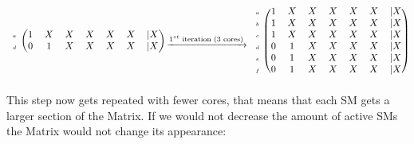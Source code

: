 \documentclass[draft, final]{vutinfth} %
\begin{document}
				\begin{equation}
					\begin{aligned}
						\begin{blockarray}{cccccccc}
							\begin{block}{c(ccccccc)}
								\scriptscriptstyle{a} & 1 & X & X & X & X & X &| X \\ 
								\scriptscriptstyle{d} & 0 & 1 & X & X & X & X &| X \\ 
							\end{block}
						\end{blockarray}
						\xrightarrow[]{\text{$1^{st}$ iteration (3 cores)}}
						\begin{blockarray}{cccccccc}
							\begin{block}{c(ccccccc)}
								\scriptscriptstyle{a} & 1 & X & X & X & X & X &| X \\ 
								\scriptscriptstyle{b} & 1 & X & X & X & X & X &| X \\ 
								\scriptscriptstyle{c} & 1 & X & X & X & X & X &| X \\ 
								\scriptscriptstyle{d} & 0 & 1 & X & X & X & X &| X \\ 
								\scriptscriptstyle{e} & 0 & 1 & X & X & X & X &| X \\ 
								\scriptscriptstyle{f} & 0 & 1 & X & X & X & X &| X \\
							\end{block}
						\end{blockarray}
					\end{aligned}
				\end{equation}
				This step now gets repeated with fewer cores, that means that each SM gets a larger section of the Matrix.
				If we would not decrease the amount of active SMs the Matrix would not change its appearance:
\end{document}
